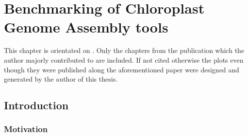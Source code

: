\newcommand{\formatprogramnames}[1]{\texttt{#1}}
\newcommand{\ce}{\formatprogramnames{chloroExtractor}}
\newcommand{\oa}{\formatprogramnames{ORG.Asm}}
\newcommand{\fp}{\formatprogramnames{Fast-Plast}}
\newcommand{\ioga}{\formatprogramnames{IOGA}}
\newcommand{\np}{\formatprogramnames{NOVOPlasty}}
\newcommand{\go}{\formatprogramnames{GetOrganelle}}
\newcommand{\cassp}{\formatprogramnames{Chloroplast assembly protocol}}



\chapter{Benchmarking of Chloroplast Genome Assembly tools } %

\label{Chapter1} %
This chapter is orientated on \cite{freudenthal2019landscape}. Only the chapters from the publication which the author majorly contributed to are included. If not cited otherwise the plots even though they were published along the aforementioned paper were designed and generated by the author of this thesis.


\newcommand{\keyword}[1]{\textbf{#1}}
\newcommand{\tabhead}[1]{\textbf{#1}}
\newcommand{\code}[1]{\texttt{#1}}
\newcommand{\file}[1]{\texttt{\bfseries#1}}
\newcommand{\option}[1]{\texttt{\itshape#1}}


\section{Introduction} \label{intro:cp}
\subsection{Motivation}

